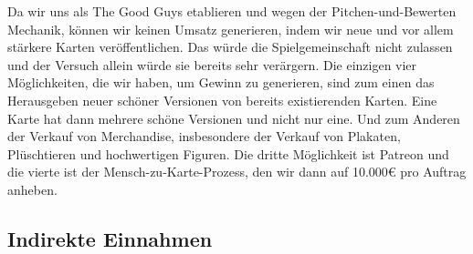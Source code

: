 \documentclass[fontsize=12, a4aper]{scrartcl}
\begin{document}
\noindent Da wir uns als \glqq The Good Guys\grqq{} etablieren und wegen der Pitchen-und-Bewerten Mechanik, können wir keinen Umsatz generieren, indem wir neue und vor allem stärkere Karten veröffentlichen. Das würde die Spielgemeinschaft nicht zulassen und der Versuch allein würde sie bereits sehr verärgern. Die einzigen vier Möglichkeiten, die wir haben, um Gewinn zu generieren, sind zum einen das Herausgeben neuer schöner Versionen von bereits existierenden Karten. Eine Karte hat dann mehrere schöne Versionen und nicht nur eine. Und zum Anderen der Verkauf von Merchandise, insbesondere der Verkauf von Plakaten, Plüschtieren und hochwertigen Figuren. Die dritte Möglichkeit ist Patreon und die vierte ist der \glqq Mensch-zu-Karte-Prozess\grqq\hfill\newline, den wir dann auf 10.000€ pro Auftrag anheben.

\subsection{Indirekte Einnahmen} \label{subsec:Indirekte_Einnahmen}
\end{document}

